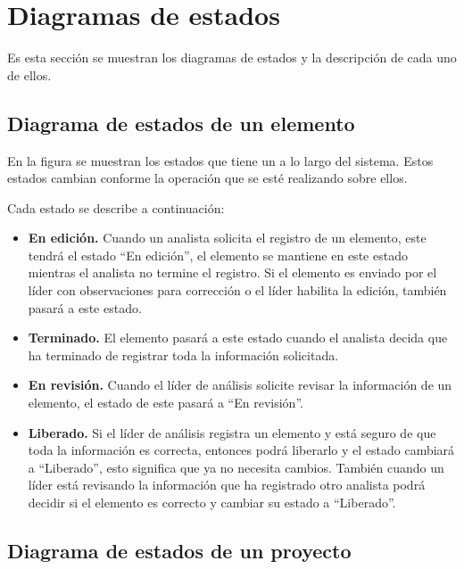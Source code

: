 \section{Diagramas de estados}
Es esta sección se muestran los diagramas de estados y la descripción de cada uno de ellos.\\

\subsection{Diagrama de estados de un elemento}

En la figura  se muestran los estados que tiene un  a lo largo 
del sistema. Estos estados cambian conforme la operación que se esté realizando sobre ellos.\\


Cada estado se describe a continuación:

\begin{itemize}
 \item {\bf En edición.} Cuando un analista solicita el registro de un elemento, este tendrá el estado ``En edición'', el elemento se mantiene en 
 este estado mientras el analista no termine el registro. Si el elemento es enviado por el líder con observaciones para corrección o el líder habilita la edición,
 también pasará a este estado.
 \item {\bf Terminado.} El elemento pasará a este estado cuando el analista decida que ha terminado de registrar toda la información solicitada.
 \item {\bf En revisión.} Cuando el líder de análisis solicite revisar la información de un elemento, el estado de este pasará a ``En revisión''.
 \item {\bf Liberado.} Si el líder de análisis registra un elemento y está seguro de que toda la información es correcta, entonces podrá liberarlo y el estado cambiará
 a ``Liberado'', esto significa que ya no necesita cambios. También cuando un líder está revisando la información que ha registrado otro analista
 podrá decidir si el elemento es correcto y cambiar su estado a ``Liberado''.
\end{itemize}

\subsection{Diagrama de estados de un proyecto}


